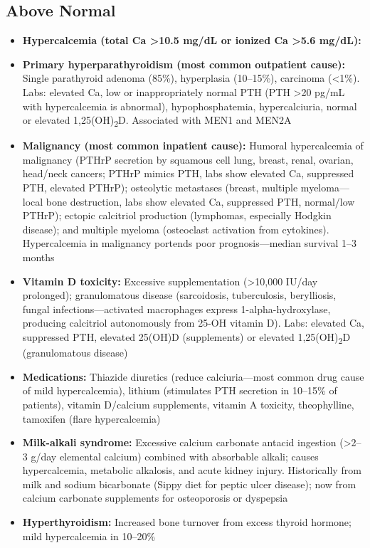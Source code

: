 \subsection*{Above Normal}
\begin{itemize}
  \item \textbf{Hypercalcemia (total Ca >10.5 mg/dL or ionized Ca >5.6 mg/dL):}
  \item \textbf{Primary hyperparathyroidism (most common outpatient cause):} Single parathyroid adenoma (85\%), hyperplasia (10--15\%), carcinoma (<1\%). Labs: elevated Ca, low or inappropriately normal PTH (PTH >20 pg/mL with hypercalcemia is abnormal), hypophosphatemia, hypercalciuria, normal or elevated 1,25(OH)\textsubscript{2}D. Associated with MEN1 and MEN2A
  \item \textbf{Malignancy (most common inpatient cause):} Humoral hypercalcemia of malignancy (PTHrP secretion by squamous cell lung, breast, renal, ovarian, head/neck cancers; PTHrP mimics PTH, labs show elevated Ca, suppressed PTH, elevated PTHrP); osteolytic metastases (breast, multiple myeloma---local bone destruction, labs show elevated Ca, suppressed PTH, normal/low PTHrP); ectopic calcitriol production (lymphomas, especially Hodgkin disease); and multiple myeloma (osteoclast activation from cytokines). Hypercalcemia in malignancy portends poor prognosis---median survival 1--3 months
  \item \textbf{Vitamin D toxicity:} Excessive supplementation (>10,000 IU/day prolonged); granulomatous disease (sarcoidosis, tuberculosis, berylliosis, fungal infections---activated macrophages express 1-alpha-hydroxylase, producing calcitriol autonomously from 25-OH vitamin D). Labs: elevated Ca, suppressed PTH, elevated 25(OH)D (supplements) or elevated 1,25(OH)\textsubscript{2}D (granulomatous disease)
  \item \textbf{Medications:} Thiazide diuretics (reduce calciuria---most common drug cause of mild hypercalcemia), lithium (stimulates PTH secretion in 10--15\% of patients), vitamin D/calcium supplements, vitamin A toxicity, theophylline, tamoxifen (flare hypercalcemia)
  \item \textbf{Milk-alkali syndrome:} Excessive calcium carbonate antacid ingestion (>2--3 g/day elemental calcium) combined with absorbable alkali; causes hypercalcemia, metabolic alkalosis, and acute kidney injury. Historically from milk and sodium bicarbonate (Sippy diet for peptic ulcer disease); now from calcium carbonate supplements for osteoporosis or dyspepsia
  \item \textbf{Hyperthyroidism:} Increased bone turnover from excess thyroid hormone; mild hypercalcemia in 10--20\%

\end{itemize}
